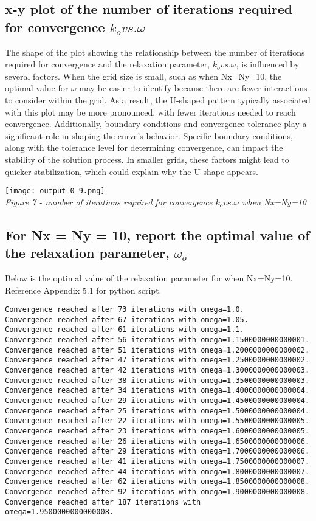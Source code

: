 \documentclass[a4paper, twoside]{article}
\begin{document}
\subsection{x-y plot of the number of iterations required for convergence $k_o vs. \omega$}
The shape of the plot showing the relationship between the number of iterations required for convergence and the relaxation parameter, $k_o vs. \omega$, is influenced by several factors. When the grid size is small, such as when Nx=Ny=10, the optimal value for $\omega$ may be easier to identify because there are fewer interactions to consider within the grid. As a result, the U-shaped pattern typically associated with this plot may be more pronounced, with fewer iterations needed to reach convergence. Additionally, boundary conditions and convergence tolerance play a significant role in shaping the curve's behavior. Specific boundary conditions, along with the tolerance level for determining convergence, can impact the stability of the solution process. In smaller grids, these factors might lead to quicker stabilization, which could explain why the U-shape appears.
\begin{center}
    \texttt{[image: output\_0\_9.png]} \\
    \textit{Figure 7 - number of iterations required for convergence $k_o vs. \omega$ when Nx=Ny=10 }
\end{center}

\newpage
\subsection{For Nx = Ny = 10, report the optimal value of the relaxation parameter, $\omega_o$}
Below is the optimal value of the relaxation parameter for when Nx=Ny=10. Reference Appendix 5.1 for python script. 
\begin{lstlisting}
Convergence reached after 73 iterations with omega=1.0.
Convergence reached after 67 iterations with omega=1.05.
Convergence reached after 61 iterations with omega=1.1.
Convergence reached after 56 iterations with omega=1.1500000000000001.
Convergence reached after 51 iterations with omega=1.2000000000000002.
Convergence reached after 47 iterations with omega=1.2500000000000002.
Convergence reached after 42 iterations with omega=1.3000000000000003.
Convergence reached after 38 iterations with omega=1.3500000000000003.
Convergence reached after 34 iterations with omega=1.4000000000000004.
Convergence reached after 29 iterations with omega=1.4500000000000004.
Convergence reached after 25 iterations with omega=1.5000000000000004.
Convergence reached after 22 iterations with omega=1.5500000000000005.
Convergence reached after 23 iterations with omega=1.6000000000000005.
Convergence reached after 26 iterations with omega=1.6500000000000006.
Convergence reached after 29 iterations with omega=1.7000000000000006.
Convergence reached after 41 iterations with omega=1.7500000000000007.
Convergence reached after 44 iterations with omega=1.8000000000000007.
Convergence reached after 62 iterations with omega=1.8500000000000008.
Convergence reached after 92 iterations with omega=1.9000000000000008.
Convergence reached after 187 iterations with omega=1.9500000000000008.
\end{lstlisting}
\end{document}
